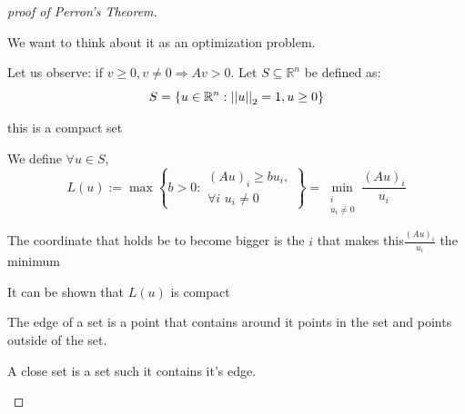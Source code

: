 \begin{proof}[proof of Perron's Theorem]
\begin{insight}
We want to think about it as an optimization problem.%
\end{insight}
Let us observe: if $v\ge0,v\ne0\Rightarrow Av>0$. Let $S\subseteq\mathbb{R}^{n}$
be defined as: 
\[
S=\left\{ u\in\mathbb{R}^{n}:\left|\left|u\right|\right|_{2}=1,u\ge0\right\} 
\]
\begin{insight}
this is a compact set%
\end{insight}

We define $\forall u\in S$, 
\[
L\left(u\right):=\max\left\{ b>0:\begin{array}{c}
\left(Au\right)_{i}\ge bu_{i},\\
\forall i\,\,u_{i}\ne0
\end{array}\right\} =\min_{\begin{array}{c}
i\\
u_{i}\ne0
\end{array}}\frac{\left(Au\right)_{i}}{u_{i}}
\]
\begin{insight}
The coordinate that holds be to become bigger is the $i$ that makes
this$\frac{\left(Au\right)_{i}}{u_{i}}$ the minimum%
\end{insight}

It can be shown that $L\left(u\right)$ is compact%
\begin{insight}
The edge of a set is a point that contains around it points in the
set and points outside of the set.

A close set is a set such it contains it's edge.


\end{insight}
\end{proof}
